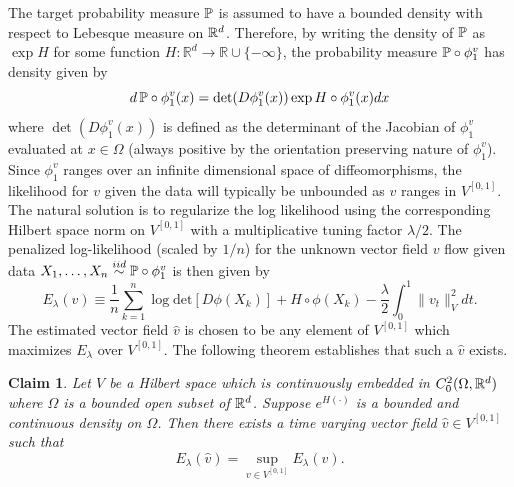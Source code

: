 \documentclass[noinfoline]{imsart}
\newtheorem{claim}{Claim}
\begin{document}
The target probability measure $\Bbb P$ is assumed to have a bounded density with respect to Lebesque measure on $\Bbb R^d$.
Therefore, by writing the density of $\Bbb P$ as $\exp H$ for some  function $H\colon\mathbb R^d\rightarrow \mathbb R\cup \{-\infty\}$, the probability measure $\Bbb P\circ \phi^v_1$ has density given by
 \[ d\,\Bbb P\circ \phi_1^v(x)  =\det (D\phi_1^v(x))  \exp H \circ \phi_1^v(x) dx  \]
 where $\det (D\phi^v_1(x))$ is defined as the  determinant of the Jacobian of $\phi^v_1$ evaluated at $x\in \Omega$ (always positive by the orientation preserving nature of $\phi^v_1$).
Since $\phi_1^v$ ranges over an infinite dimensional space of diffeomorphisms, the  likelihood for $v$ given the data  will typically be unbounded as $v$ ranges in $V^{[0,1]}$. The natural solution is to regularize the log likelihood using the corresponding  Hilbert space norm on $V^{[0,1]}$ with a  multiplicative tuning factor $\lambda/2$.
The penalized log-likelihood (scaled by $1/n$) for the unknown vector field $v$ flow given data $X_1,\ldots, X_n\overset{iid}\sim \Bbb P\circ \phi^v_1$ is then given by
 \begin{equation}
 \label{energy1}
 E_\lambda(v)\equiv  \frac{1}{n} \sum_{k=1}^n \log\text{det}[D\phi(X_k) ]+H\circ\phi(X_k)  - \frac{\lambda}{2}  \int_0^1 \| v_t \|_V^2 dt.
 \end{equation}
 The estimated vector field $\hat v$ is chosen to be any element of $V^{[0,1]}$ which maximizes $E_\lambda$ over $V^{[0,1]}$.
 The following theorem establishes that such a $\hat v$ exists.
\begin{claim}
\label{claim1}
Let $V$ be a  Hilbert space which is  continuously  embedded in $C_0^2(\Omega, \Bbb R^d)$ where $\Omega$ is a bounded open subset of $\Bbb R^d$. Suppose $e^{H(\cdot)}$ is a bounded and continuous density  on $\Omega$. Then there exists a time varying vector field $\hat v \in V^{[0,1]}$ such that
\begin{equation}
\label{exist}
E_\lambda(\hat v)=\sup_{v\in V^{[0,1]}}E_\lambda(v).
\end{equation}
\end{claim}
\end{document}
